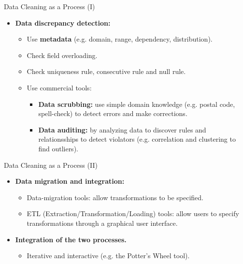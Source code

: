 \begin{frame}{Data Cleaning as a Process (I)}
	\begin{itemize}
		\item \textbf{Data discrepancy detection:}
		      \begin{itemize}
			      \item Use \textbf{\color{airforceblue}metadata} (e.g. domain,
			            range, dependency, distribution).
			      \item Check field overloading.
			      \item Check uniqueness rule, consecutive rule and null rule.
			      \item Use commercial tools:
			            \begin{itemize}
				            \item \textbf{\color{airforceblue}Data scrubbing:} use simple
				                  domain knowledge (e.g. postal code, spell-check) to detect
				                  errors and make corrections.
				            \item \textbf{\color{airforceblue}Data auditing:} by analyzing
				                  data to discover rules and relationsships to detect violators
				                  (e.g. correlation and clustering to find outliers).
			            \end{itemize}
		      \end{itemize}
	\end{itemize}
\end{frame}

\begin{frame}{Data Cleaning as a Process (II)}
	\begin{itemize}
		\item \textbf{Data migration and integration:}
		      \begin{itemize}
			      \item Data-migration tools: allow transformations to be
			            specified.
			      \item ETL (Extraction/Transformation/Loading) tools: allow
			            users to specify transformations through a graphical user
			            interface.
		      \end{itemize}
		\item \textbf{Integration of the two processes.}
		      \begin{itemize}
			      \item Iterative and interactive (e.g. the Potter's Wheel tool).
		      \end{itemize}
	\end{itemize}
\end{frame}
